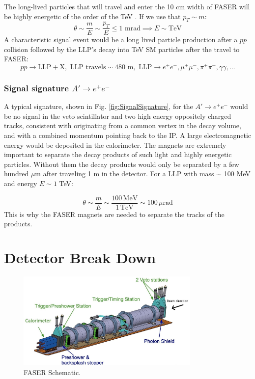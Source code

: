 The long-lived particles that will travel and enter the 10 cm width of FASER will be highly energetic of the order of the TeV \cite{faser_collaboration_faser_2019}. If we use that $p_{T}\sim m$:
\[ \theta\sim \frac{m}{E}\sim\frac{p_{T}}{E}\leq 1 \text{ mrad} \implies E\sim \text{TeV}\]
A characteristic signal event would be a long lived particle production after a $pp$ collision followed by the LLP's decay into TeV SM particles after the travel to FASER:
\[ pp \rightarrow \text{LLP} + \text{X}, \text{ LLP travels} \sim \text{480 m}, \text{ LLP} \rightarrow e^{+}e^{-}, \mu^{+}\mu^{-}, \pi^{+}\pi^{-},\gamma\gamma,\dots \]

\subsubsection{Signal signature $A'\rightarrow e^{+}e^{-}$}

A typical signature, shown in Fig. \ref{fig:SignalSignature}, for the $A'\rightarrow e^{+}e^{-}$ would be no signal in the veto scintillator and two high energy oppositely charged tracks, consistent with originating from a common vertex in the decay volume, and with a combined momentum pointing back to the IP. A large electromagnetic energy would be deposited in the calorimeter. The magnets are extremely important to separate the decay products of such light and highly energetic particles. Without them the decay products would only be separated by a few hundred $\mu$m after traveling 1 m in the detector. For a LLP with mass $\sim$ 100 MeV and energy $E\sim1$ TeV:

\[ \theta\sim\frac{m}{E}\sim\frac{100\,\text{MeV}}{1\,\text{TeV}}\sim100\,\mu\text{rad} \]
This is why the FASER magnets are needed to separate the tracks of the products.

\section{Detector Break Down}

\begin{figure}[htbp!] 
\centering    
\includegraphics[width=0.8\textwidth]{ChapterFaser/Figs/Raster/FaserSchema.jpg}  
\caption{FASER Schematic.}
\label{fig:FaserSchematic}
\end{figure}

